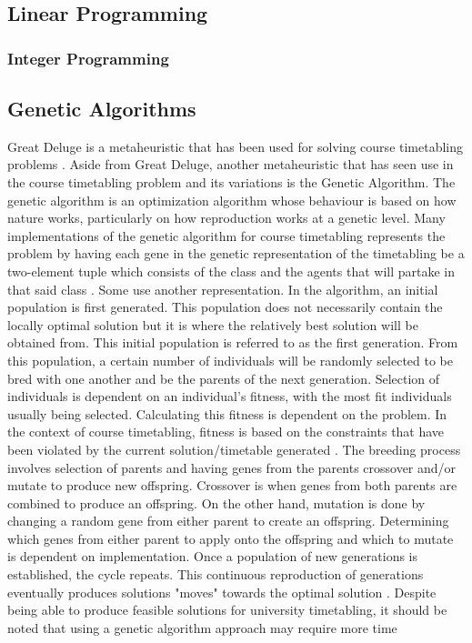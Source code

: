 \subsection{Linear Programming}
\subsubsection{Integer Programming}

\subsection{Genetic Algorithms}
Great Deluge is a metaheuristic \cite{intro-gd-dueck} that has been used for solving course timetabling problems \cite{gd-burke}\cite{nlgd-landa-silva}\cite{nlgdrl-obit}. Aside from Great Deluge, another metaheuristic that has seen use in the course timetabling problem and its variations is the Genetic Algorithm. The genetic algorithm is an optimization algorithm whose behaviour is based on how nature works, particularly on how reproduction works at a genetic level. Many implementations of the genetic algorithm for course timetabling represents the problem by having each gene in the genetic representation of the timetabling be a two-element tuple which consists of the class and the agents that will partake in that said class \cite{alves-novel-recursive}\cite{raghavjee-ga-south-africa}\cite{supachate-noval-approach-ga-thai}. Some use another representation. In the algorithm, an initial population is first generated. This population does not necessarily contain the locally optimal solution but it is where the relatively best solution will be obtained from. This initial population is referred to as the first generation. From this population, a certain number of individuals will be randomly selected to be bred with one another and be the parents of the next generation. Selection of individuals is dependent on an individual's fitness, with the most fit individuals usually being selected. Calculating this fitness is dependent on the problem. In the context of course timetabling, fitness is based on the constraints that have been violated by the current solution/timetable generated \cite{alves-novel-recursive}\cite{raghavjee-ga-south-africa}\cite{johan-ga-sa-comparison}\cite{yik-ga-timetabling}\cite{supachate-noval-approach-ga-thai}\cite{wutthipong-performance-study-genetic-operators}\cite{sanjay-an-application-of-ga}. The breeding process involves selection of parents and having genes from the parents crossover and/or mutate to produce new offspring. Crossover is when genes from both parents are combined to produce an offspring. On the other hand, mutation is done by changing a random gene from either parent to create an offspring. Determining which genes from either parent to apply onto the offspring and which to mutate is dependent on implementation. Once a population of new generations is established, the cycle repeats. This continuous reproduction of generations eventually produces solutions "moves" towards the optimal solution \cite{what-is-ga}. Despite being able to produce feasible solutions for university timetabling, it should be noted that using a genetic algorithm approach may require more time 